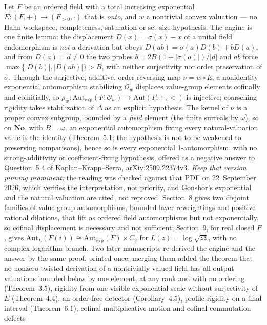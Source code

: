 \documentclass[11pt]{article}
\newcommand{\No}{\mathbf{No}}
\begin{document}
{Let $F$ be an ordered field with a total increasing exponential
$E:(F,+)\to(F_{>0},\cdot)$ that is \emph{onto}, and $w$ a nontrivial convex
valuation --- no Hahn workspace, completeness, saturation or set-size
hypothesis.  The engine is one finite lemma: the displacement
$D(x)=\sigma(x)-x$ of a unital field endomorphism is \emph{not} a derivation
but obeys $D(ab)=\sigma(a)D(b)+bD(a)$, and from $D(a)=d\ne0$ the two probes
$b=2B(1+|\sigma(a)|)/|d|$ and $ab$ force $\max\{|D(b)|,|D(ab)|\}>B$, with
neither surjectivity nor order preservation of $\sigma$.  Through the
surjective, additive, order-reversing map $\nu=w\circ E$, a nonidentity
exponential automorphism stabilizing $\mathcal{O}_w$ displaces value-group
elements cofinally and coinitially, so
$\rho_w:\mathrm{Aut}_{\exp}(F;\mathcal{O}_w)\to\mathrm{Aut}(\Gamma,+,<)$ is
injective; coarsening rigidity takes stabilization of $\Delta$ as an explicit
hypothesis.  The kernel of $\nu$ is a proper convex subgroup, bounded by a
\emph{field} element (the finite surreals by $\omega$), so on $\No$, with
$B=\omega$, an exponential automorphism fixing every natural-valuation value
is the identity (Theorem~5.1; the hypothesis is not to be weakened to
preserving comparisons), hence so is every exponential 1-automorphism, with
no strong-additivity or coefficient-fixing hypothesis, offered as a negative
answer to Question~5.4 of Kaplan--Krapp--Serra, arXiv:2509.22374v3.
\emph{Keep that version pinning prominent:} the reading was checked against
that PDF on 22~September 2026, which verifies the interpretation, not
priority, and Gonshor's exponential and the natural valuation are cited, not
reproved.  Section~8 gives two disjoint families of value-group
automorphisms, bounded-layer reweightings and positive rational dilations,
that lift as ordered field automorphisms but not exponentially, so cofinal
displacement is necessary and not sufficient; Section~9, for real closed $F$,
gives $\mathrm{Aut}_L(F(i))\cong\mathrm{Aut}_{\exp}(F)\times C_2$ for
$L(z)=\log\sqrt{z\bar z}$, with no complex-logarithm branch.  Two later
manuscripts re-derived the engine and the answer by the same proof, printed
once; merging them added the theorem that no nonzero twisted derivation of a
nontrivially valued field has all output valuations bounded below by one
element, at any rank and with no ordering (Theorem~3.5), rigidity from one
visible exponential scale without surjectivity of $E$ (Theorem~4.4), an
order-free detector (Corollary~4.5), profile rigidity on a final interval
(Theorem~6.1), cofinal multiplicative motion and cofinal commutation defects
}
\end{document}

